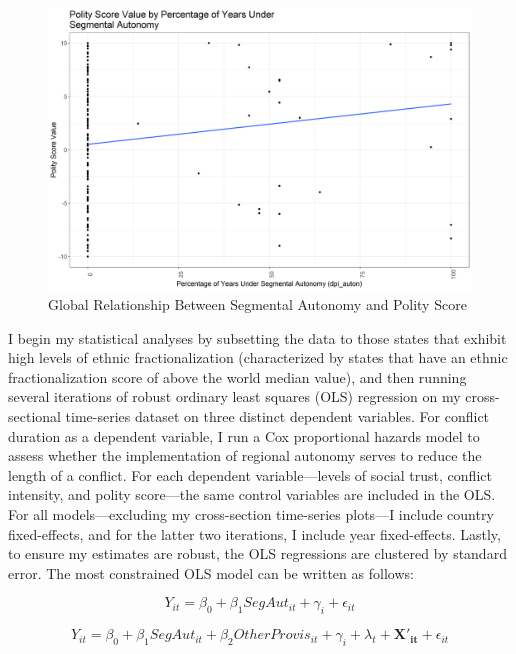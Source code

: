 \documentclass[12pt]{article}
\begin{document}
\begin{figure}[!htbp]
	\begin{center}
		\includegraphics[width = 6in]{csts_polity4_polity_score.png}
	\end{center}
	\caption{Global Relationship Between Segmental Autonomy and Polity Score}
\end{figure}

I begin my statistical analyses by subsetting the data to those states that exhibit high levels of ethnic fractionalization (characterized by states that have an ethnic fractionalization score of above the world median value), and then running several iterations of robust ordinary least squares (OLS) regression on my cross-sectional time-series dataset on three distinct dependent variables. For conflict duration as a dependent variable, I run a Cox proportional hazards model to assess whether the implementation of regional autonomy serves to reduce the length of a conflict. For each dependent variable---levels of social trust, conflict intensity, and polity score---the same control variables are included in the OLS. For all models---excluding my cross-section time-series plots---I include country fixed-effects, and for the latter two iterations, I include year fixed-effects. Lastly, to ensure my estimates are robust, the OLS regressions are clustered by standard error. The most constrained OLS model can be written as follows: 

\begin{equation}
Y_{it} = \beta_0 + \beta_1 SegAut_{it} + \gamma_i + \epsilon_{it}
\end{equation}

\begin{equation}
Y_{it} = \beta_0 + \beta_1 SegAut_{it} + \beta_2 OtherProvis_{it} + \gamma_i + \lambda_t + \mathbf{X'_{it}} + \epsilon_{it}
\end{equation}
\end{document}
